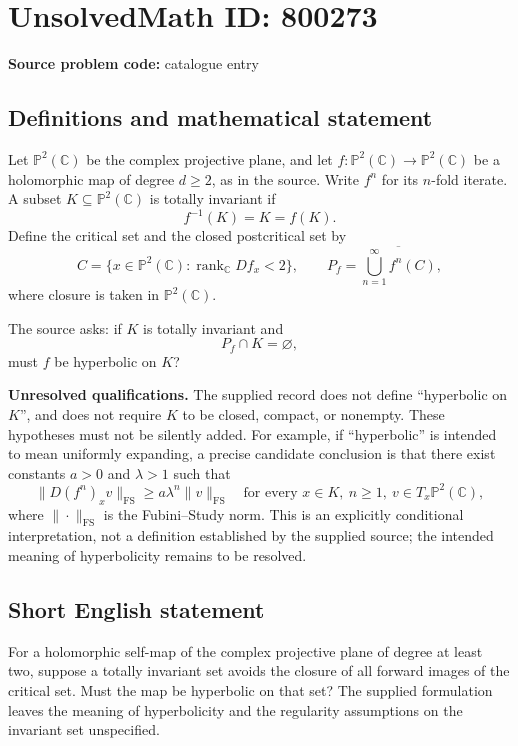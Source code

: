 \documentclass[11pt]{article}
\newcommand{\C}{\mathbb{C}}
\newcommand{\PP}{\mathbb{P}}
\begin{document}
\section*{UnsolvedMath ID: 800273}
\textbf{Source problem code:} catalogue entry
\subsection{Definitions and mathematical statement}
Let \(\PP^2(\C)\) be the complex projective plane, and let \(f:\PP^2(\C)\to\PP^2(\C)\) be a holomorphic map of degree \(d\geq 2\), as in the source. Write \(f^n\) for its \(n\)-fold iterate. A subset \(K\subseteq\PP^2(\C)\) is totally invariant if
\[
f^{-1}(K)=K=f(K).
\]
Define the critical set and the closed postcritical set by
\[
C=\{x\in\PP^2(\C):\operatorname{rank}_{\C}D f_x<2\},
\qquad
P_f=\overline{\bigcup_{n=1}^{\infty}f^n(C)},
\]
where closure is taken in \(\PP^2(\C)\).

The source asks: if \(K\) is totally invariant and
\[
P_f\cap K=\varnothing,
\]
must \(f\) be hyperbolic on \(K\)?

\textbf{Unresolved qualifications.} The supplied record does not define ``hyperbolic on \(K\)'', and does not require \(K\) to be closed, compact, or nonempty. These hypotheses must not be silently added. For example, if ``hyperbolic'' is intended to mean uniformly expanding, a precise candidate conclusion is that there exist constants \(a>0\) and \(\lambda>1\) such that
\[
\|D(f^n)_x v\|_{\mathrm{FS}}
\geq a\lambda^n\|v\|_{\mathrm{FS}}
\quad\text{for every }x\in K,\ n\geq1,
\ v\in T_x\PP^2(\C),
\]
where \(\|\cdot\|_{\mathrm{FS}}\) is the Fubini--Study norm. This is an explicitly conditional interpretation, not a definition established by the supplied source; the intended meaning of hyperbolicity remains to be resolved.
\subsection{Short English statement}
For a holomorphic self-map of the complex projective plane of degree at least two, suppose a totally invariant set avoids the closure of all forward images of the critical set. Must the map be hyperbolic on that set? The supplied formulation leaves the meaning of hyperbolicity and the regularity assumptions on the invariant set unspecified.
\end{document}
